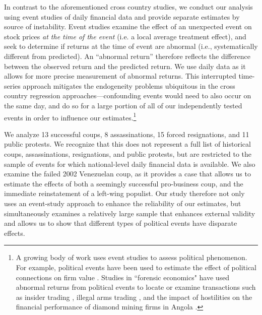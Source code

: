 \documentclass[12pt,final,fleqn]{article}
\theoremstyle{plain}
\begin{document}
In contrast to the aforementioned cross country studies, we conduct our analysis using event studies of daily financial data and provide separate estimates by source of instability. Event studies examine the effect of an unexpected event on stock prices \textit{at the time of the event} (i.e. a local average treatment effect), and seek to determine if returns at the time of event are abnormal (i.e., systematically different from predicted). An ``abnormal return'' therefore reflects the difference between the observed return and the predicted return. We use daily data as it allows for more precise measurement of abnormal returns. This interrupted time-series approach mitigates the endogeneity problems ubiquitous in the cross country regression approaches---confounding events would need to also occur on the same day, and do so for a large portion of all of our independently tested events in order to influence our estimates.\footnote{A growing body of work uses event studies to assess political phenomenon.  For example, political events have been used to estimate the effect of political connections on firm value \citep[e.g.][]{fisman2001estimating,faccio2006politically,goldman2009politically}. Studies in ``forensic economics" have used abnormal returns from political events to locate or examine transactions such as insider trading \citep{dube2011coups}, illegal arms trading \citep{dellavigna2010detecting}, and the impact of hostilities on the financial performance of diamond mining firms in Angola \citep{guidolin2007diamonds}.} 

We analyze 13 successful coups, 8 assassinations, 15 forced resignations, and 11 public protests. We recognize that this does not represent a full list of historical coups, assassinations, resignations, and public protests, but are restricted to the sample of events for which national-level daily financial data is available. We also examine the failed 2002 Venezuelan coup, as it provides a case that allows us to estimate the effects of both a seemingly successful pro-business coup, and the immediate reinstatement of a left-wing populist. Our study therefore not only uses an event-study approach to enhance the reliability of our estimates, but simultaneously examines a relatively large sample that enhances external validity and allows us to show that different types of political events have disparate effects. 
\end{document}
